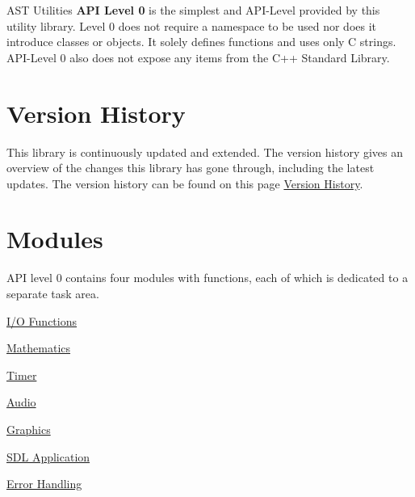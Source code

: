 A\+ST Utilities {\bfseries A\+PI Level 0} is the simplest and A\+P\+I-\/\+Level provided by this utility library. Level 0 does not require a namespace to be used nor does it introduce classes or objects. It solely defines functions and uses only C strings. A\+P\+I-\/\+Level 0 also does not expose any items from the C++ Standard Library.\hypertarget{index_hist_sect}{}\section{Version History}\label{index_hist_sect}
This library is continuously updated and extended. The version history gives an overview of the changes this library has gone through, including the latest updates. The version history can be found on this page \hyperlink{CHANGES}{Version History}.\hypertarget{index_io_sect}{}\section{Modules}\label{index_io_sect}
A\+PI level 0 contains four modules with functions, each of which is dedicated to a separate task area.


\begin{DoxyItemize}
\item \hyperlink{group__io__group}{I/O Functions}
\item \hyperlink{group__math__group}{Mathematics}
\item \hyperlink{group__timer__group}{Timer}
\item \hyperlink{group__audio__group}{Audio}
\item \hyperlink{group__graphics__group}{Graphics}
\item \hyperlink{group__sdl__group}{S\+DL Application}
\item \hyperlink{group__error__group}{Error Handling} 
\end{DoxyItemize}